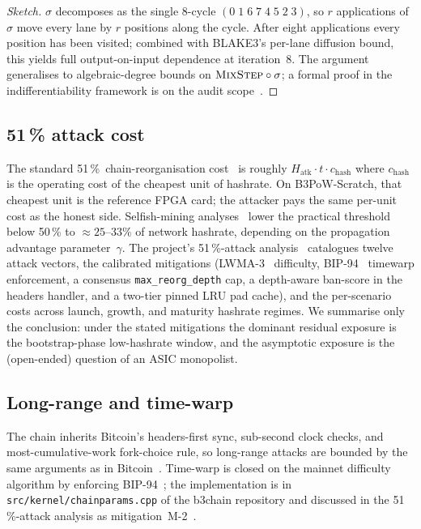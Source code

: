 \documentclass[11pt,a4paper]{article}
\theoremstyle{plain}
\theoremstyle{definition}
\theoremstyle{remark}
\begin{document}
\begin{proof}[Sketch]
$\sigma$ decomposes as the single 8-cycle $(0\;1\;6\;7\;4\;5\;2\;3)$,
so $r$ applications of $\sigma$ move every lane by $r$ positions
along the cycle. After eight applications every position has been
visited; combined with BLAKE3's per-lane diffusion bound, this
yields full output-on-input dependence at iteration~8. The argument
generalises to algebraic-degree bounds on $\textsc{MixStep}
\circ \sigma$; a formal proof in the indifferentiability framework
is on the audit scope~\cite{b3chain-auditscope}.
\end{proof}

\subsection{51\,\% attack cost}\label{sec:security-51}

The standard 51\,\%~chain-reorganisation cost~\cite{nakamoto2008bitcoin}
is roughly $H_\text{atk}\cdot t\cdot c_\text{hash}$ where $c_\text{hash}$
is the operating cost of the cheapest unit of hashrate. On
B3PoW-Scratch, that cheapest unit is the reference FPGA card; the
attacker pays the same per-unit cost as the honest side. Selfish-mining
analyses~\cite{eyal2014selfish,bonneau2015sok,sapirshtein2016selfish}
lower the practical threshold below 50\,\% to $\approx 25$--$33\%$
of network hashrate, depending on the propagation advantage
parameter~$\gamma$. The project's 51\,\%-attack
analysis~\cite{b3chain-51attack} catalogues twelve attack vectors,
the calibrated mitigations
(LWMA-3~\cite{zawy2018lwma} difficulty, BIP-94~\cite{bip94} timewarp
enforcement, a consensus \texttt{max\_reorg\_depth} cap, a depth-aware
ban-score in the headers handler, and a two-tier pinned LRU pad
cache), and the per-scenario costs across launch, growth, and
maturity hashrate regimes. We summarise only the conclusion: under
the stated mitigations the dominant residual exposure is the
bootstrap-phase low-hashrate window, and the asymptotic exposure is
the (open-ended) question of an ASIC monopolist.

\subsection{Long-range and time-warp}\label{sec:security-lrtw}

The chain inherits Bitcoin's headers-first sync, sub-second clock
checks, and most-cumulative-work fork-choice rule, so long-range
attacks are bounded by the same arguments as in
Bitcoin~\cite{nakamoto2008bitcoin}. Time-warp is closed on the
mainnet difficulty algorithm by enforcing
BIP-94~\cite{bip94}; the implementation is in
\texttt{src/kernel/chainparams.cpp} of the b3chain repository and
discussed in the 51\,\%-attack analysis as
mitigation~M-2~\cite{b3chain-51attack}.
\end{document}
